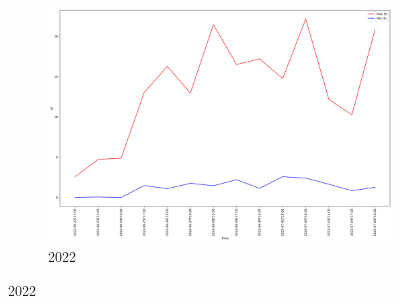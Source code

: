 \begin{figure}[h]
\begin{subfigure}{0.45\textwidth}
		\centering
		\includegraphics[width=\textwidth]{graphs/2022/ISI_maxMin.png}
		\caption{2022}
	\end{subfigure}
	\label{fig:daily_isi_maxmin}
\end{figure}

